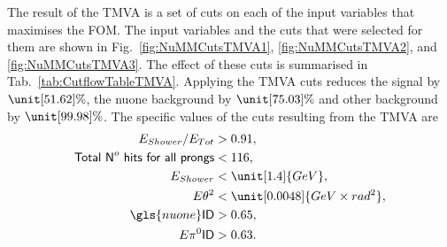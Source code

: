 
The result of the \gls{TMVA} is a set of cuts on each of the input variables that maximises the \gls{FOM}. The input variables and the cuts that were selected for them are shown in Fig.~\ref{fig:NuMMCutsTMVA1}, \ref{fig:NuMMCutsTMVA2}, and \ref{fig:NuMMCutsTMVA3}. The effect of these cuts is summarised in Tab.~\ref{tab:CutflowTableTMVA}. Applying the \gls{TMVA} cuts reduces the signal by $\unit[51.62]{\%}$, the \gls{nuone} background by $\unit[75.03]{\%}$ and other background by $\unit[99.98]{\%}$. The specific values of the cuts resulting from the \gls{TMVA} are
\begin{align}
E_{Shower}/E_{Tot} &> 0.91,\\
\textsf{Total N}^o\textsf{ hits for all prongs} &< 116,\\
E_{Shower} &< \unit[1.4]{GeV},\\
E\theta^2 &< \unit[0.0048]{GeV\times rad^2},\\
\gls{nuone}\textsf{ID} &> 0.65,\\
E\pi^0\textsf{ID} &> 0.63.
\end{align}

